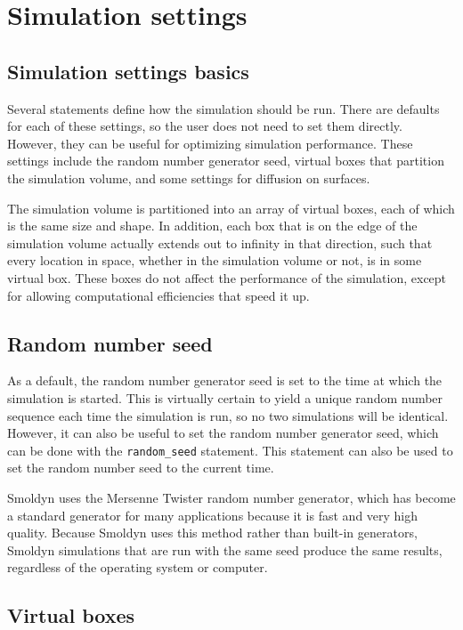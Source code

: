 \documentclass {scrbook}
\newcommand {\ttt} {\texttt}
\begin{document}
\chapter{Simulation settings}

\section{Simulation settings basics}

Several statements define how the simulation should be run. There are defaults for each of these settings, so the user does not need to set them directly. However, they can be useful for optimizing simulation performance. These settings include the random number generator seed, virtual boxes that partition the simulation volume, and some settings for diffusion on surfaces.

The simulation volume is partitioned into an array of virtual boxes, each of which is the same size and shape. In addition, each box that is on the edge of the simulation volume actually extends out to infinity in that direction, such that every location in space, whether in the simulation volume or not, is in some virtual box. These boxes do not affect the performance of the simulation, except for allowing computational efficiencies that speed it up.

\section{Random number seed}

As a default, the random number generator seed is set to the time at which the simulation is started. This is virtually certain to yield a unique random number sequence each time the simulation is run, so no two simulations will be identical. However, it can also be useful to set the random number generator seed, which can be done with the \ttt{random\_seed} statement. This statement can also be used to set the random number seed to the current time.

Smoldyn uses the Mersenne Twister random number generator, which has become a standard generator for many applications because it is fast and very high quality. Because Smoldyn uses this method rather than built-in generators, Smoldyn simulations that are run with the same seed produce the same results, regardless of the operating system or computer.

\section{Virtual boxes}
\end{document}
